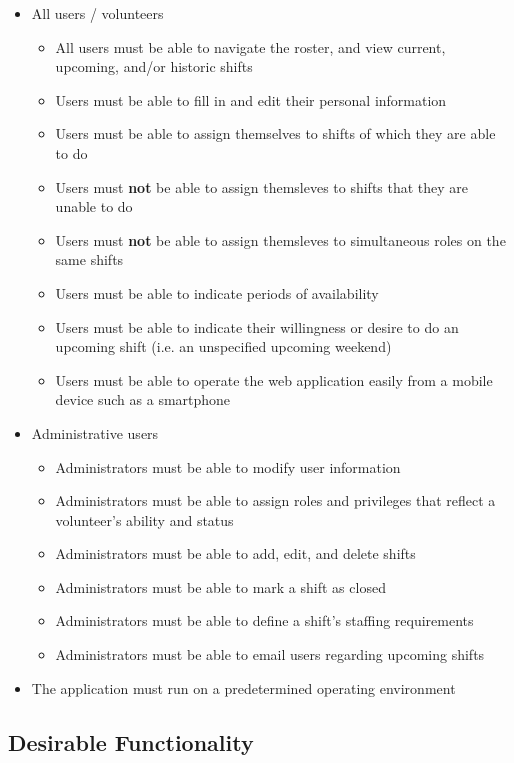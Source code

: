 \begin{itemize}
    \item All users / volunteers
    \begin{itemize}
        \item All users must be able to navigate the roster, and view current, upcoming, and/or historic shifts
        \item Users must be able to fill in and edit their personal information
        \item Users must be able to assign themselves to shifts of which they are able to do
        \item Users must \textbf{not} be able to assign themsleves to shifts that they are unable to do
        \item Users must \textbf{not} be able to assign themsleves to simultaneous roles on the same shifts
        \item Users must be able to indicate periods of availability
        \item Users must be able to indicate their willingness or desire to do an upcoming shift (i.e. an unspecified upcoming weekend)
        \item Users must be able to operate the web application easily from a mobile device such as a smartphone
    \end{itemize}
    \item Administrative users
    \begin{itemize}
        \item Administrators must be able to modify user information
        \item Administrators must be able to assign roles and privileges that reflect a volunteer's ability and status
        \item Administrators must be able to add, edit, and delete shifts
        \item Administrators must be able to mark a shift as closed
        \item Administrators must be able to define a shift's staffing requirements
        \item Administrators must be able to email users regarding upcoming shifts
    \end{itemize} 
    \item The application must run on a predetermined operating environment
\end{itemize}

\subsection{Desirable Functionality}


